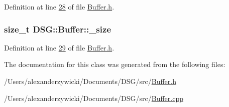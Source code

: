 Definition at line \hyperlink{_buffer_8h_source_l00028}{28} of file \hyperlink{_buffer_8h_source}{Buffer.\+h}.

\hypertarget{class_d_s_g_1_1_buffer_a4e2fef9ed617af2554b25c999def8f71}{
\subsubsection[{\+\_\+size}]{\setlength{\rightskip}{0pt plus 5cm}size\+\_\+t D\+S\+G\+::\+Buffer\+::\+\_\+size\hspace{0.3cm}{\ttfamily [protected]}}}\label{class_d_s_g_1_1_buffer_a4e2fef9ed617af2554b25c999def8f71}


Definition at line \hyperlink{_buffer_8h_source_l00029}{29} of file \hyperlink{_buffer_8h_source}{Buffer.\+h}.



The documentation for this class was generated from the following files\+:\begin{DoxyCompactItemize}
\item 
/\+Users/alexanderzywicki/\+Documents/\+D\+S\+G/src/\hyperlink{_buffer_8h}{Buffer.\+h}\item 
/\+Users/alexanderzywicki/\+Documents/\+D\+S\+G/src/\hyperlink{_buffer_8cpp}{Buffer.\+cpp}\end{DoxyCompactItemize}
